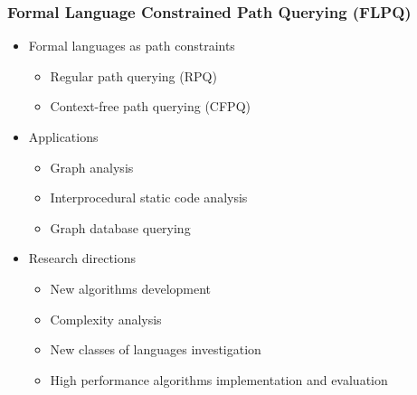 \documentclass[xcolor=table,aspectratio=169]{beamer}
\begin{document}
\begin{frame}[fragile]
  \frametitle{Formal Language Constrained Path Querying (FLPQ)}
  \begin{itemize}
    \item Formal languages as path constraints 
    \begin{itemize}
      \item Regular path querying (RPQ)
      \item Context-free path querying (CFPQ)
    \end{itemize} 
    \item Applications 
    \begin{itemize}
      \item Graph analysis
      \item Interprocedural static code analysis
      \item Graph database querying
    \end{itemize}
    \pause
    \item Research directions
    \begin{itemize}
      \item New algorithms development
      \item Complexity analysis
      \item New classes of languages investigation
      \item High performance algorithms implementation and evaluation 
    \end{itemize}
  \end{itemize}
\end{frame}
\end{document}
